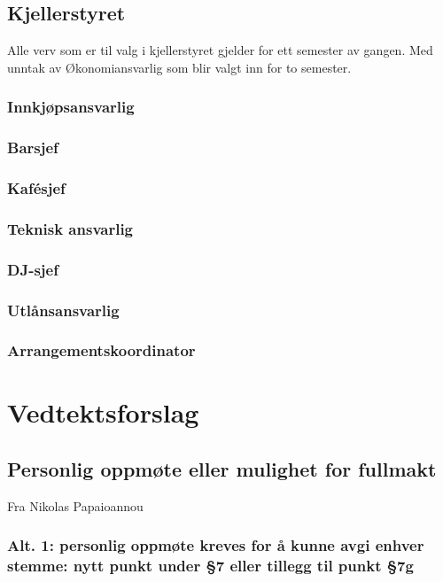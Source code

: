 \documentclass[10pt,norsk,a4paper]{article}
\begin{document}
\begin{minipage}[t]{0.49\textwidth}
\subsection{Kjellerstyret} %
Alle verv som er til valg i kjellerstyret gjelder for ett semester av gangen. Med unntak av Økonomiansvarlig som blir valgt inn for to semester.

\subsubsection{Innkjøpsansvarlig}
\subsubsection{Barsjef}
\subsubsection{Kafésjef}
\subsubsection{Teknisk ansvarlig}
\subsubsection{DJ-sjef}
\subsubsection{Utlånsansvarlig}
\subsubsection{Arrangementskoordinator}

\newpage

\section{Vedtektsforslag}

\subsection{Personlig oppmøte eller mulighet for fullmakt}
Fra Nikolas Papaioannou

\subsubsection{Alt. 1: personlig oppmøte kreves for å kunne avgi enhver stemme:
               nytt punkt under §7 eller tillegg til punkt §7g}


\end{minipage}
\end{document}
